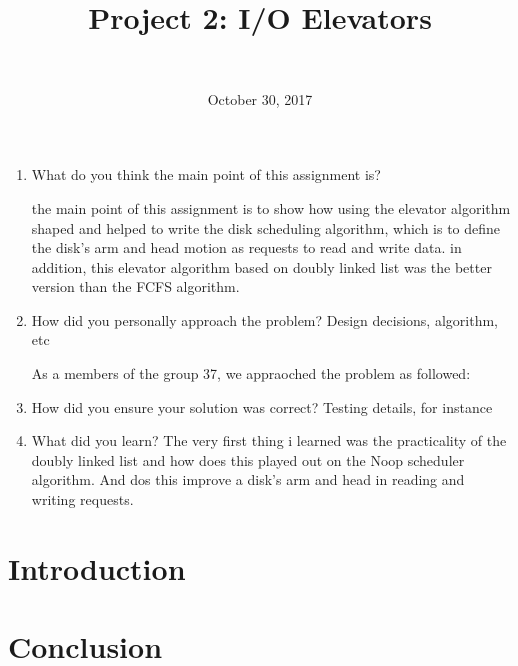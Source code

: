 \documentclass[10pt,draftclsnofoot,onecolumn,journal,compsoc]{IEEEtran}
\title{Project 2: I/O Elevators}
\author{
  \IEEEauthorblockN{Taylor Alexander Brown and Lucien Armand Tamdja Tamno} \\
  \IEEEauthorblockA{CS 444: Operating Systems II \\ Oregon State University}
}
\date{October 30, 2017}
\begin{document}
\maketitle
\IEEEdisplaynontitleabstractindextext
\IEEEpeerreviewmaketitle
\vfill

\newpage
\begin{enumerate}
 
\item {What do you think the main point of this assignment is?}
\par 
the main point of this assignment is to show how using the elevator algorithm shaped and helped to write the disk scheduling algorithm, which is
to define the disk's arm and head motion as requests to read and write data. in addition, this elevator algorithm based on doubly linked list was
the better version than the FCFS algorithm. \par

\item{ How did you personally approach the problem? Design decisions, algorithm, etc}
\par
As a members of the group 37, we appraoched the problem as followed:


	\item{How did you ensure your solution was correct? Testing details, for instance}
	\par

	\item {What did you learn?}
	The very first thing i learned was the practicality of the doubly linked list and how does this played out on the Noop scheduler algorithm. 
	And dos this improve a disk's arm and head in reading and writing requests. 



\end{enumerate}
\tableofcontents

\newpage

\section{Introduction}



\section{Conclusion}
\end{document}
